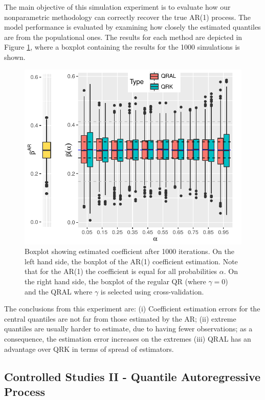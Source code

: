 The main objective of this simulation experiment is to evaluate how our nonparametric methodology can correctly recover the true AR(1) process. The model performance is evaluated by examining how closely the estimated quantiles are from the populational ones. The results for each method are depicted in Figure \ref{fig:boxplot-ar1}, where a boxplot containing the results for the 1000 simulations is shown. %
\begin{figure}[h]
	\centering
	\includegraphics[width=1.0\linewidth]{Images/boxplot-ar1.pdf}
	\caption{Boxplot showing estimated coefficient after 1000 iterations. On the left hand side, the boxplot of the AR(1) coefficient estimation. Note that for the AR(1) the coefficient is equal for all probabilities $\alpha$. On the right hand side, the boxplot of the regular QR (where $\gamma = 0$) and the QRAL where $\gamma$ is selected using cross-validation. }
	\label{fig:boxplot-ar1}
\end{figure}
The conclusions from this experiment are: (i) Coefficient estimation errors for the central quantiles are not far from those estimated by the AR; (ii) extreme quantiles are usually harder to estimate, due to having fewer observations; as a consequence, the estimation error increases on the extremes (iii) QRAL has an advantage over QRK in terms of spread of estimators.


\subsection{Controlled Studies II - Quantile Autoregressive Process} \label{sec:qar-study}

